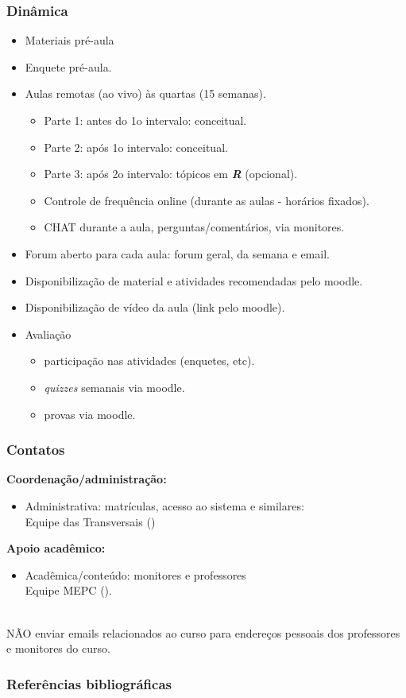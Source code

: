 \documentclass[handout,serif, professionalfont, usenames, dvipsnames, aspectratio = 169]{beamer}\usepackage[]{graphicx}\usepackage[]{color}
\begin{document}
\begin{frame}
  \frametitle{Dinâmica}  
  \begin{itemize}
  \item Materiais pré-aula
  \item Enquete pré-aula.
  \item Aulas remotas (ao vivo) às quartas (15 semanas).
    \begin{itemize}
    \item Parte 1: antes do 1o intervalo: conceitual.
    \item Parte 2: após 1o intervalo: conceitual.
    \item Parte 3: após 2o intervalo: tópicos em \textsl{\bf R} (opcional).
    \item Controle de frequência online (durante as aulas - horários fixados).
    \item CHAT durante a aula, perguntas/comentários, via monitores.
    \end{itemize}
  \item Forum aberto para cada aula: forum geral, da semana e email.
  \item Disponibilização de material e atividades recomendadas pelo moodle.
  \item Disponibilização de vídeo da aula (link pelo moodle).
  \item Avaliação 
    \begin{itemize}
    \item participação nas atividades (enquetes, etc).
    \item \textit{quizzes} semanais via moodle.
    \item provas via moodle.
    \end{itemize}
\end{itemize}
\end{frame}

\begin{frame}
  \frametitle{Contatos}
  \textbf{Coordenação/administração:}
  \begin{itemize}
     \item Administrativa: matrículas, acesso ao sistema e similares: \\ Equipe das Transversais () 
 \end{itemize}
  \textbf{Apoio acadêmico:}
  \begin{itemize}
  \item Acadêmica/conteúdo: monitores e professores \\ Equipe MEPC ().
  \end{itemize}

  
   \\
  NÃO enviar emails relacionados ao curso para endereços pessoais dos professores e monitores do curso.
\end{frame}



\begin{frame}[fragile]
  \frametitle{Referências bibliográficas}
  
  \begin{tiny}
    
  \end{tiny}
  
\end{frame}
\end{document}
